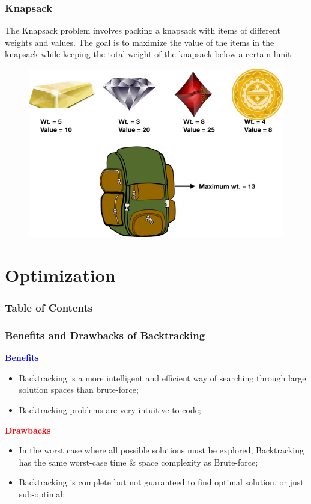 \documentclass[
	11pt,
]{beamer}
\begin{document}
\begin{frame}
	\frametitle{Knapsack}
	The Knapsack problem involves packing a knapsack with items of different weights and values. The goal is to maximize the value of the items in the knapsack while keeping the total weight of the knapsack below a certain limit.
    \begin{figure}
        \centering
        \includegraphics[scale=0.3]{Figs/knapsack.png}
    \end{figure}
\end{frame}

\section{Optimization}
\begin{frame}
    \frametitle{Table of Contents}
    \tableofcontents[currentsection]
\end{frame}

\begin{frame}
    \frametitle{Benefits and Drawbacks of Backtracking}
    \large{\textcolor{blue}{\textbf{Benefits}}}
    \bigskip
	\begin{itemize}
		\item Backtracking is a more intelligent and efficient way of searching through large solution spaces than brute-force;
		\bigskip
		\item Backtracking problems are very intuitive to code;
	\end{itemize}
	\bigskip
	\large{\textcolor{red}{\textbf{Drawbacks}}}
    \bigskip
	\begin{itemize}
		\item In the worst case where all possible solutions must be explored, Backtracking has the same worst-case time \& space complexity as Brute-force;
		\bigskip
		\item Backtracking is complete but not guaranteed to find optimal solution, or just sub-optimal;
	\end{itemize}
    
\end{frame}
\end{document}
